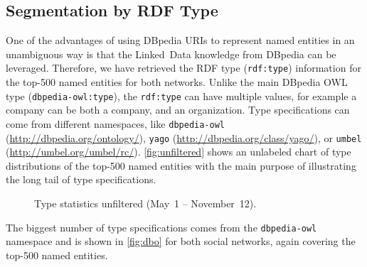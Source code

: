 \documentclass{iosart2c}
\begin{document}
\subsection{Segmentation by RDF Type}
One of the advantages of using DBpedia URIs to represent named entities in an unambiguous way is that the Linked~Data knowledge from DBpedia can be leveraged.
Therefore, we have retrieved the RDF type (\texttt{rdf:type}) information for the top-500 named entities for both networks.
Unlike the main DBpedia OWL type (\texttt{dbpedia-owl:type}), the \texttt{rdf:type} can have multiple values, for example a company can be both a company, and an organization.
Type specifications can come from different namespaces, like \texttt{dbpedia-owl} (\url{http://dbpedia.org/ontology/}), \texttt{yago} (\url{http://dbpedia.org/class/yago/}), or \texttt{umbel} (\url{http://umbel.org/umbel/rc/}).
\autoref{fig:unfiltered} shows an unlabeled chart of type distributions of the top-500 named entities with the main purpose of illustrating the long tail of type specifications. 

\begin{figure}
  \centering
    \qquad
\caption{Type statistics unfiltered (May~1 -- November~12).}
\label{fig:unfiltered}
\end{figure}

The biggest number of type specifications comes from the \texttt{dbpedia-owl} namespace and is shown in \autoref{fig:dbo} for both social networks, again covering the top-500 named entities.
\end{document}
